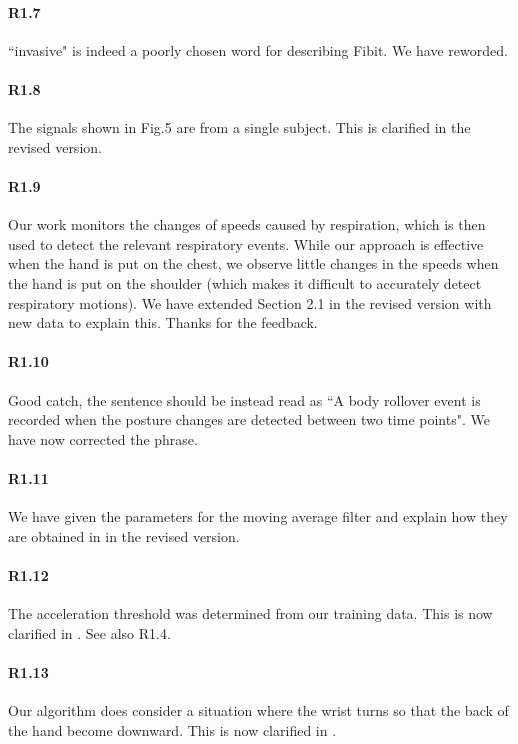 \paragraph{R1.7} ``invasive" is indeed a poorly chosen word for describing Fibit. We have reworded.
\vspace{-2mm}
\paragraph{R1.8} The signals shown in Fig.5 are from a single subject. This is clarified in the revised version.

\paragraph{R1.9} Our work monitors the changes of speeds caused by respiration, which is then used to detect the relevant respiratory events.
While our approach is effective when the hand is put on the chest, we observe little changes in the speeds when the hand is put on the
shoulder (which makes it difficult to accurately detect respiratory motions). We have extended Section 2.1 in the revised version with new
data to explain this. Thanks for the feedback.

\paragraph{R1.10} Good catch, the sentence should be instead read as ``A body rollover event is recorded when the posture changes are detected between
two time points". We have now corrected the phrase.

\paragraph{R1.11} We have given the parameters for the moving average filter and explain how they are obtained in  in the revised version.

\paragraph{R1.12} The acceleration threshold was determined from our training data. This is now clarified in . See also
R1.4.

\vspace{-2mm}
\paragraph{R1.13} Our algorithm does consider a situation where the wrist turns so that the back of the hand become downward. This is now clarified in .

